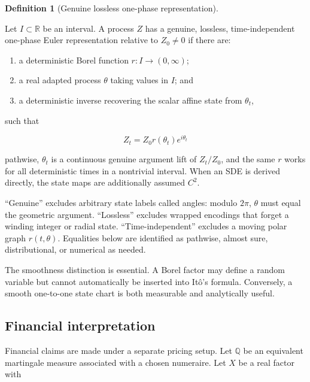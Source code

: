 \documentclass[
  english,
  10pt,
  letterpaper,
  DIV=11,
  numbers=noendperiod]{scrartcl}
\providecommand{\tightlist}{%
  \setlength{\itemsep}{0pt}\setlength{\parskip}{0pt}}
\theoremstyle{definition}
\newtheorem{definition}{Definition}[section]
\theoremstyle{plain}
\theoremstyle{plain}
\theoremstyle{remark}
\begin{document}
\begin{definition}[Genuine lossless one-phase
representation]\protect\hypertarget{def-one-phase}{}\label{def-one-phase}

Let \(I\subset\mathbb R\) be an interval. A process \(Z\) has a genuine,
lossless, time-independent one-phase Euler representation relative to
\(Z_0\ne0\) if there are:

\begin{enumerate}
\def\labelenumi{\arabic{enumi}.}
\tightlist
\item
  a deterministic Borel function \(r:I\to(0,\infty)\);
\item
  a real adapted process \(\theta\) taking values in \(I\); and
\item
  a deterministic inverse recovering the scalar affine state from
  \(\theta_t\),
\end{enumerate}

such that

\[
Z_t=Z_0r(\theta_t)e^{i\theta_t}
\]

pathwise, \(\theta_t\) is a continuous genuine argument lift of
\(Z_t/Z_0\), and the same \(r\) works for all deterministic times in a
nontrivial interval. When an SDE is derived directly, the state maps are
additionally assumed \(C^2\).

\end{definition}

``Genuine'' excludes arbitrary state labels called angles: modulo
\(2\pi\), \(\theta\) must equal the geometric argument. ``Lossless''
excludes wrapped encodings that forget a winding integer or radial
state. ``Time-independent'' excludes a moving polar graph
\(r(t,\theta)\). Equalities below are identified as pathwise, almost
sure, distributional, or numerical as needed.

The smoothness distinction is essential. A Borel factor may define a
random variable but cannot automatically be inserted into Itô's formula.
Conversely, a smooth one-to-one state chart is both measurable and
analytically useful.

\subsection{Financial interpretation}\label{financial-interpretation}

Financial claims are made under a separate pricing setup. Let
\(\mathbb Q\) be an equivalent martingale measure associated with a
chosen numeraire. Let \(X\) be a real factor with
\end{document}
